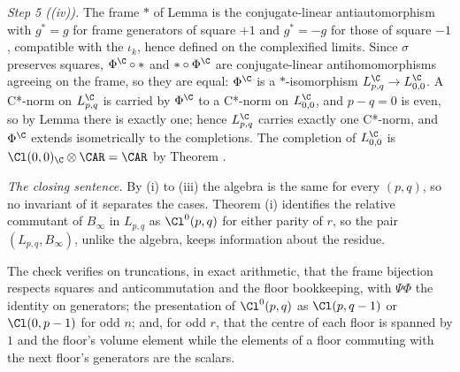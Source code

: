 \emph{Step 5 ((iv)).} The frame $*$ of Lemma  is the conjugate-linear antiautomorphism with $g^{*} = g$ for frame generators of square $+1$ and $g^{*} = -g$ for those of square $-1$, compatible with the $\iota_{k}$, hence defined on the complexified limits. Since $\sigma$ preserves squares, $\Phi^{\C} \circ *$ and $* \circ \Phi^{\C}$ are conjugate-linear antihomomorphisms agreeing on the frame, so they are equal: $\Phi^{\C}$ is a $*$-isomorphism $L_{p,q}^{\C} \to L_{0,0}^{\C}$. A C*-norm on $L_{p,q}^{\C}$ is carried by $\Phi^{\C}$ to a C*-norm on $L_{0,0}^{\C}$, and $p - q = 0$ is even, so by Lemma  there is exactly one; hence $L_{p,q}^{\C}$ carries exactly one C*-norm, and $\Phi^{\C}$ extends isometrically to the completions. The completion of $L_{0,0}^{\C}$ is $\Cl(0,0)_{\C} \otimes \CAR = \CAR$ by Theorem .

\emph{The closing sentence.} By (i) to (iii) the algebra is the same for every $(p,q)$, so no invariant of it separates the cases. Theorem (i) identifies the relative commutant of $B_{\infty}$ in $L_{p,q}$ as $\Cl^{0}(p,q)$ for either parity of $r$, so the pair $(L_{p,q}, B_{\infty})$, unlike the algebra, keeps information about the residue.

The check verifies on truncations, in exact arithmetic, that the frame bijection respects squares and anticommutation and the floor bookkeeping, with $\Psi\Phi$ the identity on generators; the presentation of $\Cl^{0}(p,q)$ as $\Cl(p,q-1)$ or $\Cl(0,p-1)$ for odd $n$; and, for odd $r$, that the centre of each floor is spanned by $1$ and the floor's volume element while the elements of a floor commuting with the next floor's generators are the scalars.
